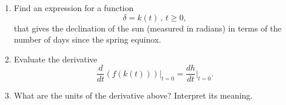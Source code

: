 \documentclass{ximera}
\begin{document}
\begin{question}
\begin{enumerate}
\begin{enumerate}
\item Find an expression for a function
\[
     \delta = k(t) \, , \, t\geq 0,
\]
that gives the declination of the sun (measured in radians) in terms of the number of days since the spring equinox. 

\item Evaluate the derivative
\[
  \frac{d}{dt}\left( f(k(t))  \right)\Big|_{t= 0} =    \frac{dh}{dt} \Big|_{t= 0} .
\]

\item What are the units of the derivative above? Interpret its meaning. 

\end{enumerate}
\end{enumerate}


\end{question}
\end{document}
